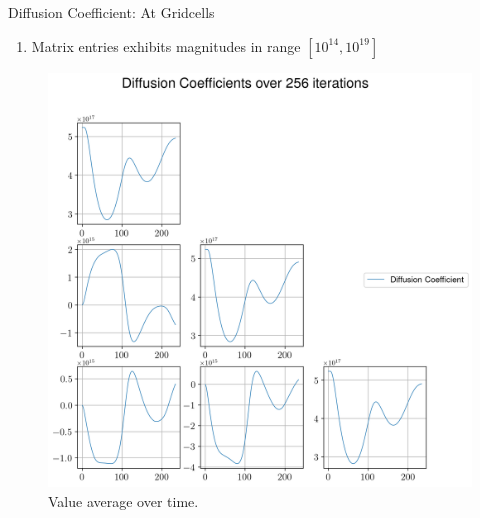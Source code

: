 \begin{frame}[c]{Diffusion Coefficient: At Gridcells}
    \begin{enumerate}
        \item Matrix entries exhibits magnitudes in range $[10^{14}, 10^{19}]$
    \end{enumerate}
    \begin{multicols}{2}
    \begin{figure}[!htb]
        \centering
        \captionsetup{justification=centering}
      \includegraphics[width=1.05\linewidth]{figures/D_matrix_time_comparison.png}
      \caption{Value average over time.}
      \label{fig:Fd_asymptotic_behavior_2nd}
    \end{figure}
    \columnbreak
    \begin{figure}[!htb]
        \centering
        \captionsetup{justification=centering}

\end{figure}
\end{multicols}
\end{frame}
